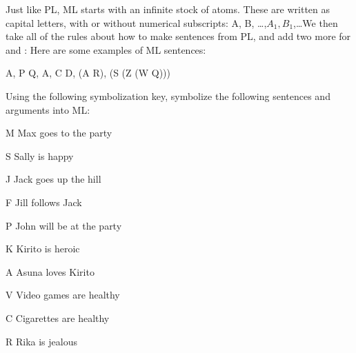 Just like PL, ML starts with an infinite stock of atoms. These are written as capital letters, with or without numerical subscripts: A, B, \ldots,$ A_1, B_1$,\ldots We then take all of the rules about how to make sentences from PL, and add two more for \ebox  and \ediamond :
Here are some examples of ML sentences:
\begin{center}
A, P \eor  Q, \ebox A, C \eor  \ebox D, \ebox \ebox (A \eif  R), \ebox \ediamond (S \eand  (Z \eiff  (\ebox W \eor  \ediamond Q)))
\end{center}
\practiceproblems
\problempart
Using the following symbolization key, symbolize the following sentences and arguments into ML:
	\begin{ekey}
		\item[M] Max goes to the party
		\item[S] Sally is happy
		\item[J] Jack goes up the hill
		\item[F] Jill follows Jack
		\item[P] John will be at the party
		\item[K] Kirito is heroic
		\item[A] Asuna loves Kirito
		\item[V] Video games are healthy
		\item[C] Cigarettes are healthy
		\item[R] Rika is jealous
	\end{ekey}

